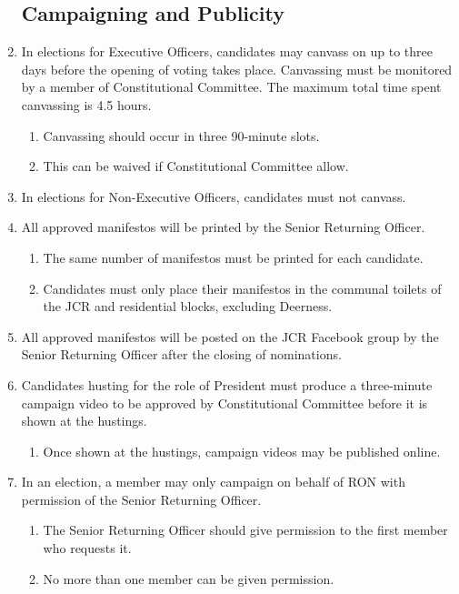 \documentclass[12pt]{article}  %
\begin{document}
\begin{enumerate}
    \subsection{Campaigning and Publicity}
    \item In elections for Executive Officers, candidates may canvass on up to three days before the opening of voting takes place. Canvassing must be monitored by a member of Constitutional Committee. The maximum total time spent canvassing is 4.5 hours.
    \begin{enumerate}
        \item Canvassing should occur in three 90-minute slots.
        \item This can be waived if Constitutional Committee allow.
    \end{enumerate}
    \item In elections for Non-Executive Officers, candidates must not canvass.
    \item All approved manifestos will be printed by the Senior Returning Officer.
    \begin{enumerate}
        \item The same number of manifestos must be printed for each candidate.
        \item Candidates must only place their manifestos in the communal toilets of the JCR and residential blocks, excluding Deerness.
    \end{enumerate}
    \item All approved manifestos will be posted on the JCR Facebook group by the Senior Returning Officer after the closing of nominations.
    \item Candidates husting for the role of President must produce a three-minute campaign video to be approved by Constitutional Committee before it is shown at the hustings.
    \begin{enumerate}
        \item Once shown at the hustings, campaign videos may be published online.
    \end{enumerate}
    \item In an election, a member may only campaign on behalf of RON with permission of the Senior Returning Officer.
    \begin{enumerate}
        \item The Senior Returning Officer should give permission to the first member who requests it.
        \item No more than one member can be given permission.

\end{enumerate}
\end{enumerate}
\end{document}
